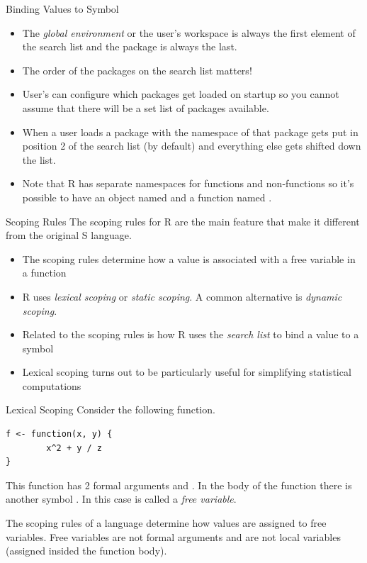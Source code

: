 \documentclass[aspectratio=169]{beamer}
\begin{document}
\begin{frame}[fragile]{Binding Values to Symbol}
\begin{itemize}
\item
The \textit{global environment} or the user's workspace is always the
first element of the search list and the  package is always
the last.  
\item
The order of the packages on the search list matters!
\item
User's can configure which packages get loaded on startup so you
cannot assume that there will be a set list of packages available.
\item
When a user loads a package with  the namespace of that
package gets put in position 2 of the search list (by default) and
everything else gets shifted down the list.
\item
Note that R has separate namespaces for functions and non-functions so
it's possible to have an object named  and a function named
.
\end{itemize}
\end{frame}

\begin{frame}{Scoping Rules}
The scoping rules for R are the main feature that make it different
from the original S language.  
\begin{itemize}
\item
The scoping rules determine how a value is associated with a free
variable in a function
\item
R uses \textit{lexical scoping} or \textit{static scoping}.  A common
alternative is \textit{dynamic scoping}.
\item
Related to the scoping rules is how R uses the \textit{search list} to
bind a value to a symbol
\item
Lexical scoping turns out to be particularly useful for simplifying
statistical computations
\end{itemize}
\end{frame}

\begin{frame}[fragile]{Lexical Scoping}
Consider the following function.
\begin{verbatim}
f <- function(x, y) {
        x^2 + y / z
}
\end{verbatim}
This function has 2 formal arguments  and .  In the
body of the function there is another symbol .  In this case
 is called a \textit{free variable}.

The scoping rules of a language determine how values are assigned to
free variables.  Free variables are not formal arguments and are not
local variables (assigned insided the function body).
\end{frame}
\end{document}
